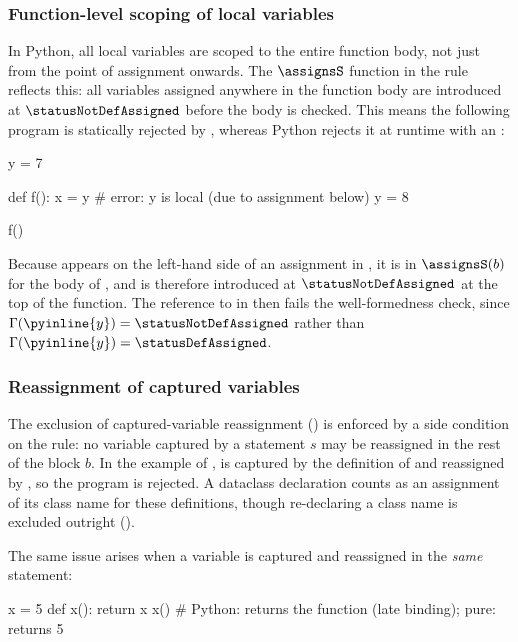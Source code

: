 \begin{PaperOnly}
\subsubsection{Function-level scoping of local variables}

In Python, all local variables are scoped to the entire function body, not just from the point of
assignment onwards. The $\assignsS$ function in the  rule reflects this: all variables
assigned anywhere in the function body are introduced at $\statusNotDefAssigned$ before the body is checked. This means
the following program is statically rejected by \PurePy, whereas Python rejects it at runtime with an
:

\begin{python}
y = 7

def f():
    x = y  # error: y is local (due to assignment below)
    y = 8

f()
\end{python}

\noindent Because  appears on the left-hand side of an assignment in , it is in
$\assignsS(b)$ for the body of , and is therefore introduced at $\statusNotDefAssigned$ at the top of the
function. The reference to  in  then fails the well-formedness check, since
$\Gamma(\pyinline{y}) = \statusNotDefAssigned$ rather than $\Gamma(\pyinline{y}) = \statusDefAssigned$.

\subsubsection{Reassignment of captured variables}
\label{sec:captured-vars}

The exclusion of captured-variable reassignment () is enforced by a side condition
on the  rule: no variable captured by a statement $s$ may be reassigned in the rest of the block
$b$. In the example of ,  is captured by the definition of
 and reassigned by , so the program is rejected. A dataclass declaration counts as
an assignment of its class name for these definitions, though re-declaring a class name is excluded outright
().

The same issue arises when a variable is captured and reassigned in the \emph{same} statement:

\begin{python}
x = 5
def x():
    return x
x()  # Python: returns the function (late binding); pure: returns 5
\end{python}


\end{PaperOnly}
